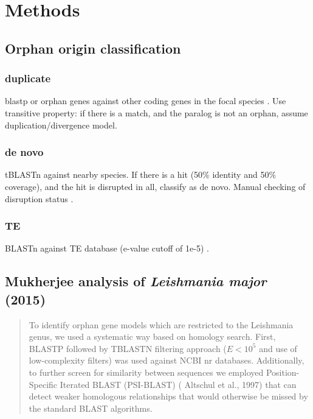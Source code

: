 \section{Methods}

\subsection{Orphan origin classification}

  \subsubsection{duplicate}

    blastp or orphan genes against other coding genes in the focal species
    \cite{sun_identification_2015}. Use transitive property: if there is a
    match, and the paralog is not an orphan, assume duplication/divergence
    model. 

  \subsubsection{de novo}

    tBLASTn against nearby species. If there is a hit (50\% identity and 50\%
    coverage), and the hit is disrupted in all, classify as de novo. Manual
    checking of disruption status \cite{sun_identification_2015}.

  \subsubsection{TE}

    BLASTn against TE database (e-value cutoff of 1e-5)
    \cite{sun_identification_2015}.

\subsection{Mukherjee analysis of \textit{Leishmania major} (2015)}

  \cite{mukherjee_elucidating_2015}


  \begin{quote}

    To identify orphan gene models which are restricted to the Leishmania
    genus, we used a systematic way based on homology search. First, BLASTP
    followed by TBLASTN filtering approach ($E<10^5$ and use of low-complexity
    filters) was used against NCBI nr databases. Additionally, to further
    screen for similarity between sequences we employed Position-Specific
    Iterated BLAST (PSI-BLAST) ( Altschul et al., 1997) that can detect weaker
    homologous relationships that would otherwise be missed by the standard
    BLAST algorithms.

  \end{quote}

